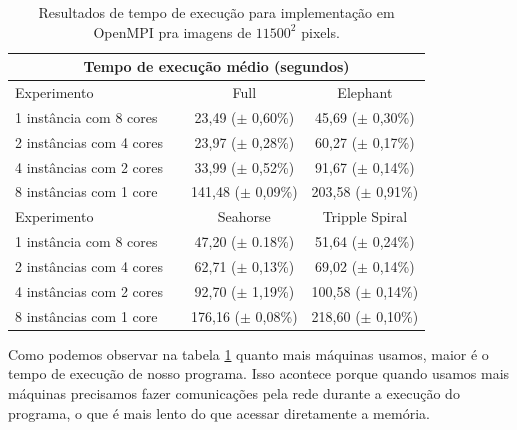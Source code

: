 \documentclass[12pt]{article}
\begin{document}
\begin{table}[ht] 
    \begin{center} 
    \begin{tabular}{@{}lc cc@{}} 
        \multicolumn{4}{c}{Tempo de execução médio (segundos)}\\
        \hline
        \hline
        Experimento && Full & Elephant \\
        \hline
        1 instância com 8 cores &&  
                                    23,49 ($\pm$ 0,60\%) &  
                                    45,69 ($\pm$ 0,30\%) \\ 
        2 instâncias com 4 cores && 
                                    23,97 ($\pm$ 0,28\%) &
                                    60,27 ($\pm$ 0,17\%) \\
        4 instâncias com 2 cores && 
                                    33,99 ($\pm$ 0,52\%) &
                                    91,67 ($\pm$ 0,14\%) \\
        8 instâncias com 1 core && 
                                   141,48 ($\pm$ 0,09\%) &
                                   203,58 ($\pm$ 0,91\%) \\

        \hline
        Experimento && Seahorse & Tripple  Spiral \\
        \hline
        1 instância com 8 cores &&
                                    47,20 ($\pm$ 0.18\%) & 
                                    51,64 ($\pm$ 0,24\%) \\
        2 instâncias com 4 cores && 
                                    62,71 ($\pm$ 0,13\%) &
                                    69,02 ($\pm$ 0,14\%) \\
        4 instâncias com 2 cores && 
                                    92,70 ($\pm$ 1,19\%) &
                                    100,58 ($\pm$ 0,14\%) \\
        8 instâncias com 1 core && 
                                   176,16 ($\pm$ 0,08\%) &
                                   218,60 ($\pm$ 0,10\%) \\
        \hline
        \hline
    \end{tabular} \caption{Resultados de tempo de execução para 
        implementação em OpenMPI pra imagens de $11500^2$ pixels.}
        \label{tabela:openmpi}
    \end{center} 
\end{table}

Como podemos observar na tabela \ref{tabela:openmpi} quanto mais 
máquinas usamos, maior é o tempo de execução de nosso programa. Isso 
acontece porque quando usamos mais máquinas precisamos fazer 
comunicações pela rede durante a execução do programa, o que é mais 
lento do que acessar diretamente a memória.
\end{document}
